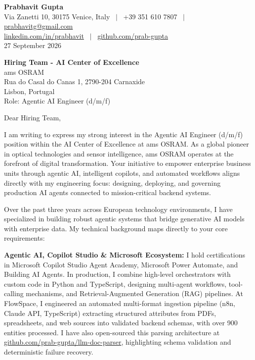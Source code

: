 \documentclass[10.5pt,a4paper]{article}
\begin{document}
\textbf{\large Prabhavit Gupta}\\
Via Zanetti 10, 30175 Venice, Italy ~$\vert$~ +39 351 610 7807 ~$\vert$~ \href{mailto:prabhavitg@gmail.com}{prabhavitg@gmail.com}\\
\href{https://www.linkedin.com/in/prabhavit/}{linkedin.com/in/prabhavit} ~$\vert$~ \href{https://github.com/prab-gupta}{github.com/prab-gupta}\\
27 September 2026

\textbf{Hiring Team - AI Center of Excellence}\\
ams OSRAM\\
Rua do Casal do Canas 1, 2790-204 Carnaxide\\
Lisbon, Portugal\\
Role: Agentic AI Engineer (d/m/f)

Dear Hiring Team,

I am writing to express my strong interest in the Agentic AI Engineer (d/m/f) position within the AI Center of Excellence at ams OSRAM. As a global pioneer in optical technologies and sensor intelligence, ams OSRAM operates at the forefront of digital transformation. Your initiative to empower enterprise business units through agentic AI, intelligent copilots, and automated workflows aligns directly with my engineering focus: designing, deploying, and governing production AI agents connected to mission-critical backend systems.

Over the past three years across European technology environments, I have specialized in building robust agentic systems that bridge generative AI models with enterprise data. My technical background maps directly to your core requirements:

\textbf{Agentic AI, Copilot Studio \& Microsoft Ecosystem:} I hold certifications in Microsoft Copilot Studio Agent Academy, Microsoft Power Automate, and Building AI Agents. In production, I combine high-level orchestrators with custom code in Python and TypeScript, designing multi-agent workflows, tool-calling mechanisms, and Retrieval-Augmented Generation (RAG) pipelines. At FlowSpace, I engineered an automated multi-format ingestion pipeline (n8n, Claude API, TypeScript) extracting structured attributes from PDFs, spreadsheets, and web sources into validated backend schemas, with over 900 entities processed. I have also open-sourced this parsing architecture at \href{https://github.com/prab-gupta/llm-doc-parser}{github.com/prab-gupta/llm-doc-parser}, highlighting schema validation and deterministic failure recovery.
\end{document}
